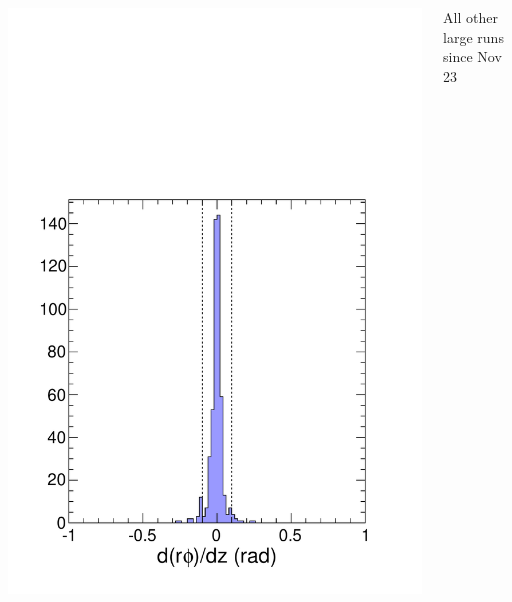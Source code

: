 \documentclass[compress]{beamer}
\begin{document}
\begin{frame}
\begin{columns}
\includegraphics[width=\linewidth]{tworuns_beampointing.pdf}

\begin{center}
All other large runs \\ since Nov 23
\end{center}


\end{columns}
\end{frame}
\end{document}
